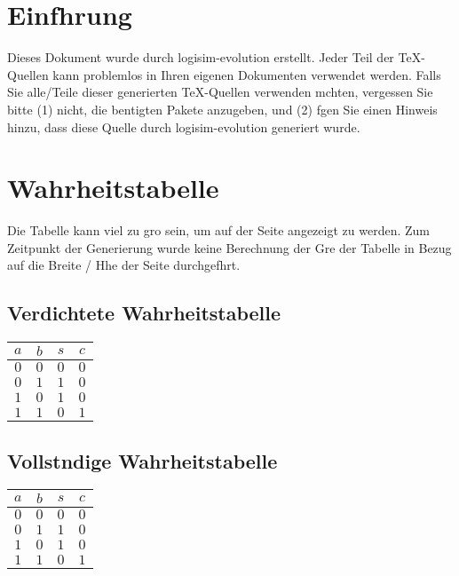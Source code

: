 \documentclass [15pt,a4paper,twoside]{article}
\begin{document}
\section{Einfhrung}
Dieses Dokument wurde durch logisim-evolution erstellt. Jeder Teil der TeX-Quellen kann problemlos in Ihren eigenen Dokumenten verwendet werden. Falls Sie alle/Teile dieser generierten TeX-Quellen verwenden mchten, vergessen Sie bitte (1) nicht, die bentigten Pakete anzugeben, und (2) fgen Sie einen Hinweis hinzu, dass diese Quelle durch logisim-evolution generiert wurde.
\section{Wahrheitstabelle}
Die Tabelle kann viel zu gro sein, um auf der Seite angezeigt zu werden. Zum Zeitpunkt der Generierung wurde keine Berechnung der Gre der Tabelle in Bezug auf die Breite / Hhe der Seite durchgefhrt.
\subsection{Verdichtete Wahrheitstabelle}
\begin{center}
\begin{tabular}{cc|cc}
$a$&$b$&$s$&$c$\\
\hline
$0$&$0$&$0$&$0$\\
$0$&$1$&$1$&$0$\\
$1$&$0$&$1$&$0$\\
$1$&$1$&$0$&$1$\\

\end{tabular}
\end{center}
\subsection{Vollstndige Wahrheitstabelle}
\begin{center}
\begin{tabular}{cc|cc}
$a$&$b$&$s$&$c$\\
\hline
$0$&$0$&$0$&$0$\\
$0$&$1$&$1$&$0$\\
$1$&$0$&$1$&$0$\\
$1$&$1$&$0$&$1$\\

\end{tabular}
\end{center}
\end{document}
